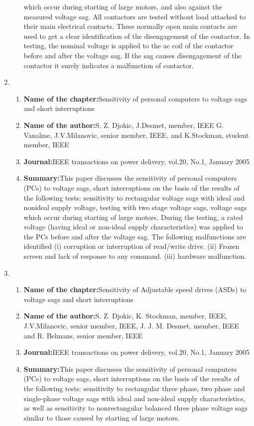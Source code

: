 \documentclass[12pt, a4paper]{extreport}
\begin{document}
\begin{enumerate}
\begin{enumerate}
which occur during
starting of large motors,
and also against the
measured voltage sag. All
contactors are tested
without load attached to
their main electrical
contacts. These normally
open main contacts are
used to get a clear
identification of the
disengagement of the
contactor. In testing, the
nominal voltage is applied
to the ac coil of the
contactor before and after
the voltage sag. If the sag
causes disengagement of
the contactor it surely
indicates a malfunction of
contactor.
\end{enumerate}
\item
    \begin{enumerate}
     \item{\textbf{Name of the chapter:}}Sensitivity of
personal
computers to
voltage sags and
short
interruptions
\item{\textbf{Name of the author:}}S. Z. Djokic,
J.Desmet,
member, IEEE
G. Vanalme,
J.V.Milanovic,
senior member,
IEEE, and
K.Stockman,
student
member, IEEE
\item{\textbf{Journal:}}IEEE
transactions
on power
delivery,
vol.20, No.1,
January 2005
\item{\textbf{Summary:}}This paper discusses the
sensitivity of personal
computers (PCs) to
voltage sags, short
interruptions on the basis
of the results of the
following tests: sensitivity
to rectangular voltage
sags with ideal and nonideal
supply voltage,
testing with two stage
voltage sags, voltage sags
which occur during
starting of large motors.
During the testing, a
rated voltage (having ideal
or non-ideal supply
characteristics) was
applied to the PCs before
and after the voltage sag.
The following
malfunctions are identified
(i) corruption or
interruption of read/write
drive. (ii) Frozen screen
and lack of response to
any command. (iii)
hardware malfunction.
    \end{enumerate}
    \item
    \begin{enumerate}
    \item{\textbf{Name of the chapter:}}Sensitivity of
Adjustable speed
drives (ASDs) to
voltage sags and
short
interruptions
\item{\textbf{Name of the author:}}S. Z. Djokic,
K. Stockman,
member, IEEE,
J.V.Milanovic,
senior member,
IEEE,
J. J. M.
Desmet,
member, IEEE
and
R. Belmans,
senior member,
IEEE
\item{\textbf{Journal:}}IEEE
transactions
on power
delivery,
vol.20, No.1,
January 2005
\item{\textbf{Summary:}}This paper discusses the
sensitivity of personal
computers (PCs) to
voltage sags, short
interruptions on the basis
of the results of the
following tests: sensitivity
to rectangular three
phase, two phase and
single-phase voltage sags
with ideal and non-ideal
supply characteristics, as
well as sensitivity to nonrectangular
balanced three
phase voltage sags similar
to those caused by
starting of large motors.


\end{enumerate}
\end{enumerate}
\end{document}
